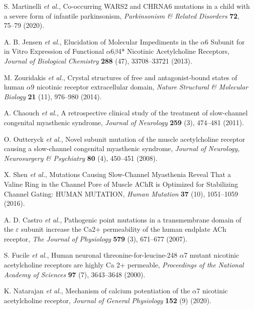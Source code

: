 S. Martinelli {\em et al.}, Co-occurring WARS2 and CHRNA6 mutations in a child with a severe form of infantile parkinsonism, {\em Parkinsonism \& Related Disorders} {\bf 72}, 75--79 (2020).

A. B. Jensen {\em et al.}, Elucidation of Molecular Impediments in the $\alpha$6 Subunit for in Vitro Expression of Functional $\alpha$6$\beta$4* Nicotinic Acetylcholine Receptors, {\em Journal of Biological Chemistry} {\bf 288} (47), 33708--33721 (2013).

M. Zouridakis {\em et al.}, Crystal structures of free and antagonist-bound states of human $\alpha$9 nicotinic receptor extracellular domain, {\em Nature Structural \& Molecular Biology} {\bf 21} (11), 976--980 (2014).

A. Chaouch {\em et al.}, A retrospective clinical study of the treatment of slow-channel congenital myasthenic syndrome, {\em Journal of Neurology} {\bf 259} (3), 474--481 (2011).

O. Outteryck {\em et al.}, Novel   subunit mutation of the muscle acetylcholine receptor causing a slow-channel congenital myasthenic syndrome, {\em Journal of Neurology, Neurosurgery \& Psychiatry} {\bf 80} (4), 450--451 (2008).

X. Shen {\em et al.}, Mutations Causing Slow-Channel Myasthenia Reveal That a Valine Ring in the Channel Pore of Muscle AChR is Optimized for Stabilizing Channel Gating: HUMAN MUTATION, {\em Human Mutation} {\bf 37} (10), 1051--1059 (2016).

A. D. Castro {\em et al.}, Pathogenic point mutations in a transmembrane domain of the $\varepsilon$ subunit increase the Ca2+ permeability of the human endplate ACh receptor, {\em The Journal of Physiology} {\bf 579} (3), 671--677 (2007).

S. Fucile {\em et al.}, Human neuronal threonine-for-leucine-248 $\alpha$7 mutant nicotinic acetylcholine receptors are highly Ca 2+ permeable, {\em Proceedings of the National Academy of Sciences} {\bf 97} (7), 3643--3648 (2000).

K. Natarajan {\em et al.}, Mechanism of calcium potentiation of the $\alpha$7 nicotinic acetylcholine receptor, {\em Journal of General Physiology} {\bf 152} (9) (2020).


